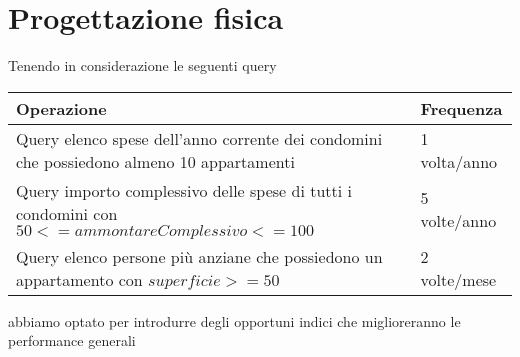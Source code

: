 \section{Progettazione fisica}
\label{fisico}

Tenendo in considerazione le seguenti query

\begin{tabular}{|p{320pt}|l|}
	\hline
	\textbf{Operazione} & \textbf{Frequenza} \\ \hline
	Query elenco spese dell'anno corrente dei condomini che possiedono almeno 10 appartamenti & 1 volta/anno \\ \hline
	Query importo complessivo delle spese di tutti i condomini con $50 <= ammontareComplessivo <= 100$ & 5 volte/anno \\ \hline
	Query elenco persone più anziane che possiedono un appartamento con $superficie >= 50$ & 2 volte/mese \\ \hline
\end{tabular}

abbiamo optato per introdurre degli opportuni indici che miglioreranno le performance generali

